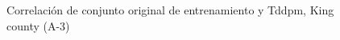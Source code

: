 \begin{figure}[H]
    \centering
    
    \caption{Correlación de conjunto original de entrenamiento y Tddpm, King county (A-3)}
    \label{pairwise-king county-a-3-tddpm_mlp}
\end{figure}